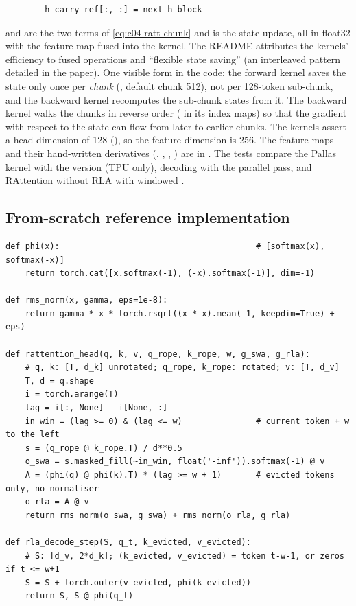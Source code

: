 \begin{implnote}[title={In the code: the Pallas kernels}]
\begin{lstlisting}
        h_carry_ref[:, :] = next_h_block
\end{lstlisting}
 and  are the two terms of \eqref{eq:c04-ratt-chunk} and
 is the state update, all in float32 with the feature map fused into the kernel.
The README attributes the kernels' efficiency to fused operations and ``flexible state saving''
(an interleaved pattern detailed in the paper). One visible form in the code: the forward kernel
saves the state only once per \emph{chunk} (, default chunk 512), not per 128-token
sub-chunk, and the backward kernel recomputes the sub-chunk states from it. The backward kernel
walks the chunks in reverse order ( in its index maps) so that the
gradient with respect to the state can flow from later to earlier chunks. The kernels assert a head
dimension of 128 (), so the feature dimension is 256. The feature maps and
their hand-written derivatives (, , ,
) are in .
The tests compare the Pallas kernel with the  version (TPU only), decoding with the
parallel pass, and RAttention without RLA with windowed .
\end{implnote}

\subsection{From-scratch reference implementation}

\begin{lstlisting}[caption={Reference implementation (ours): RATTENTION for one head, parallel form and decoding step.},label={lst:c04-ratt-ref}]
def phi(x):                                        # [softmax(x), softmax(-x)]
    return torch.cat([x.softmax(-1), (-x).softmax(-1)], dim=-1)

def rms_norm(x, gamma, eps=1e-8):
    return gamma * x * torch.rsqrt((x * x).mean(-1, keepdim=True) + eps)

def rattention_head(q, k, v, q_rope, k_rope, w, g_swa, g_rla):
    # q, k: [T, d_k] unrotated; q_rope, k_rope: rotated; v: [T, d_v]
    T, d = q.shape
    i = torch.arange(T)
    lag = i[:, None] - i[None, :]
    in_win = (lag >= 0) & (lag <= w)               # current token + w to the left
    s = (q_rope @ k_rope.T) / d**0.5
    o_swa = s.masked_fill(~in_win, float('-inf')).softmax(-1) @ v
    A = (phi(q) @ phi(k).T) * (lag >= w + 1)       # evicted tokens only, no normaliser
    o_rla = A @ v
    return rms_norm(o_swa, g_swa) + rms_norm(o_rla, g_rla)

def rla_decode_step(S, q_t, k_evicted, v_evicted):
    # S: [d_v, 2*d_k]; (k_evicted, v_evicted) = token t-w-1, or zeros if t <= w+1
    S = S + torch.outer(v_evicted, phi(k_evicted))
    return S, S @ phi(q_t)
\end{lstlisting}


